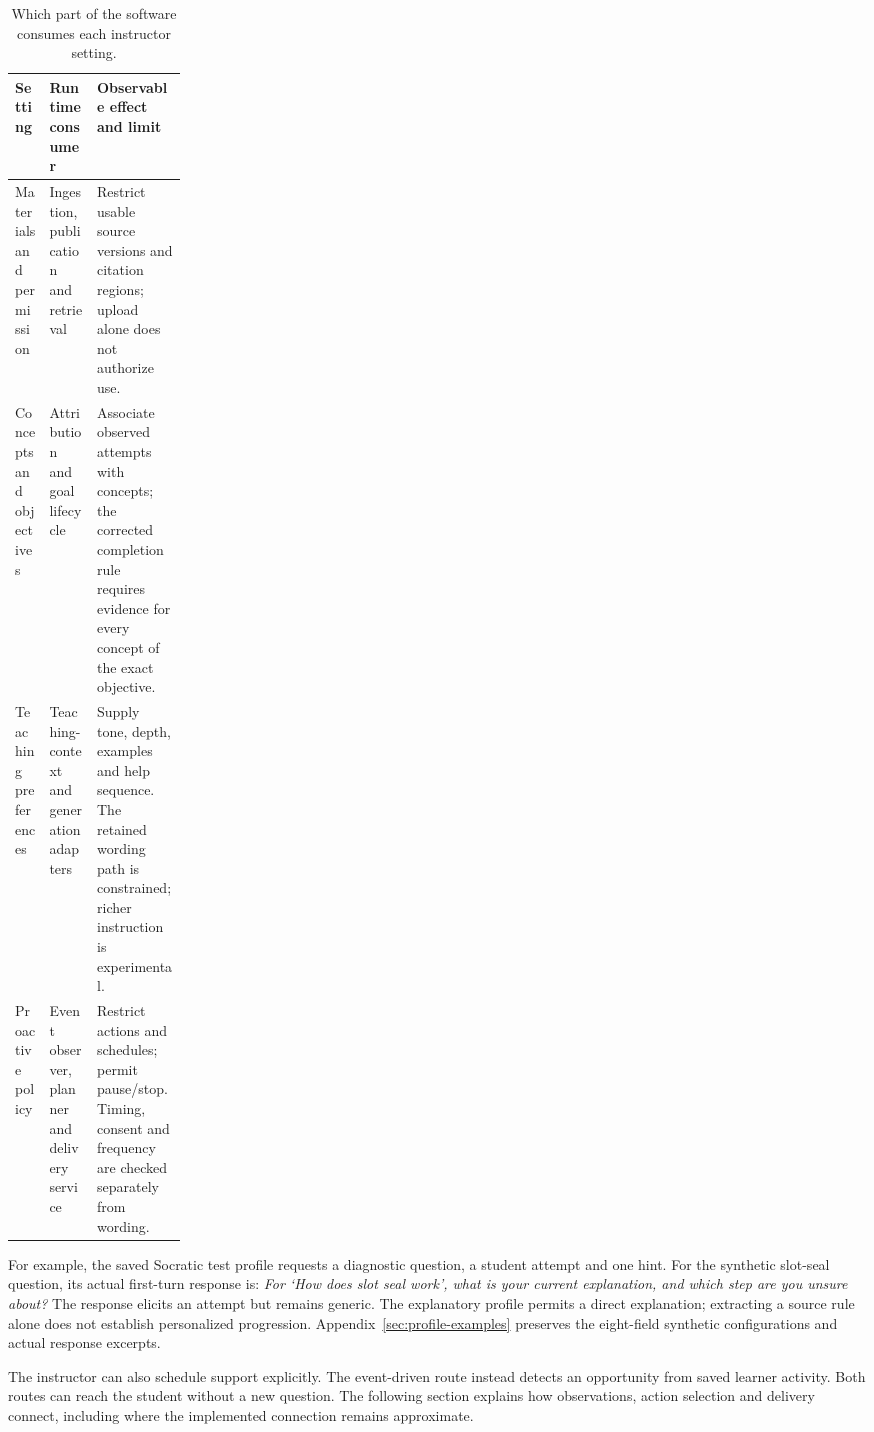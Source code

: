 \begin{table}[htbp]
\centering\small
\caption{Which part of the software consumes each instructor setting.}
\label{tab:configuration}
\begin{tabularx}{\linewidth}{@{}L{0.20\linewidth}Y Y@{}}
\toprule Setting & Runtime consumer & Observable effect and limit \\\midrule
Materials and permission & Ingestion, publication and retrieval & Restrict usable source versions and citation regions; upload alone does not authorize use. \\
Concepts and objectives & Attribution and goal lifecycle & Associate observed attempts with concepts; the corrected completion rule requires evidence for every concept of the exact objective. \\
Teaching preferences & Teaching-context and generation adapters & Supply tone, depth, examples and help sequence. The retained wording path is constrained; richer instruction is experimental. \\
Proactive policy & Event observer, planner and delivery service & Restrict actions and schedules; permit pause/stop. Timing, consent and frequency are checked separately from wording. \\
\bottomrule
\end{tabularx}
\end{table}

For example, the saved Socratic test profile requests a diagnostic question,
a student attempt and one hint. For the synthetic slot-seal question, its
actual first-turn response is: \emph{For \lq{}How does slot seal work\rq{}, what is
your current explanation, and which step are you unsure about?}
The response elicits an attempt but remains generic. The explanatory profile
permits a direct explanation; extracting a source rule alone does not establish
personalized progression. Appendix~\ref{sec:profile-examples} preserves the
eight-field synthetic configurations and actual response excerpts.

The instructor can also schedule support explicitly. The event-driven route
instead detects an opportunity from saved learner activity. Both routes can
reach the student without a new question. The following section explains how
observations, action selection and delivery connect, including where the
implemented connection remains approximate.
